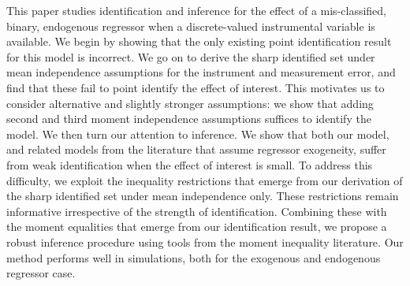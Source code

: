 This paper studies identification and inference for the effect of a mis-classified, binary, endogenous regressor when a discrete-valued instrumental variable is available. 
We begin by showing that the only existing point identification result for this model is incorrect. 
We go on to derive the sharp identified set under mean independence assumptions for the instrument and measurement error, and find that these fail to point identify the effect of interest.
This motivates us to consider alternative and slightly stronger assumptions: we show that adding second and third moment independence assumptions suffices to identify the model.
We then turn our attention to inference.
We show that both our model, and related models from the literature that assume regressor exogeneity, suffer from weak identification when the effect of interest is small.
To address this difficulty, we exploit the inequality restrictions that emerge from our derivation of the sharp identified set under mean independence only.
These restrictions remain informative irrespective of the strength of identification.
Combining these with the moment equalities that emerge from our identification result, we propose a robust inference procedure using tools from the moment inequality literature.
Our method performs well in simulations, both for the exogenous and endogenous regressor case.
